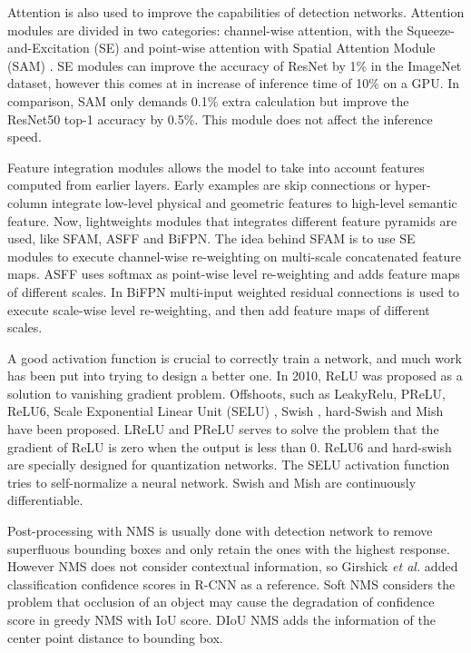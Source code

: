 Attention is also used to improve the capabilities of detection networks. Attention modules are divided in two categories: channel-wise attention, with the Squeeze-and-Excitation (SE)\cite{squeezeExcite} and point-wise attention with Spatial Attention Module (SAM) \cite{sam}. SE modules can improve the accuracy of ResNet by 1\% in the ImageNet\cite{imageNet} dataset, however this comes at in increase of inference time of 10\% on a GPU. In comparison, SAM only demands 0.1\% extra calculation but improve the ResNet50 top-1 accuracy by 0.5\%. This module does not affect the inference speed.

Feature integration modules allows the model to take into account features computed from earlier layers. Early examples are skip connections\cite{skipCo} or hyper-column\cite{hyperColumn} integrate low-level physical and geometric features to high-level semantic feature. Now, lightweights modules that integrates different feature pyramids are used, like SFAM\cite{SFAM}, ASFF\cite{ASFF} and BiFPN\cite{bifpn}. The idea behind SFAM is to use SE modules to execute channel-wise re-weighting on multi-scale concatenated feature maps. ASFF uses softmax as point-wise level re-weighting and adds feature maps of different scales. In BiFPN multi-input weighted residual connections is used to execute scale-wise level re-weighting, and then add feature maps of different scales.

A good activation function is crucial to correctly train a network, and much work has been put into trying to design a better one. In 2010, ReLU\cite{relu} was proposed as a solution to vanishing gradient problem. Offshoots, such as LeakyRelu\cite{leakyRelu}, PReLU\cite{prelu}, ReLU6\cite{mobileNet}, Scale Exponential Linear Unit (SELU) \cite{selu}, Swish \cite{swish}, hard-Swish\cite{hswish} and Mish\cite{mish} have been proposed. LReLU and PReLU serves to solve the problem that the gradient of ReLU is zero when the output is less than 0. ReLU6 and hard-swish are specially designed for quantization networks. The SELU activation function tries to self-normalize a neural network. Swish and Mish are continuously differentiable.

Post-processing with NMS is usually done with detection network to remove superfluous bounding boxes and only retain the ones with the highest response. However NMS does not consider contextual information, so Girshick \textit{et al.}\cite{girshick2013} added classification confidence scores in R-CNN as a reference. Soft NMS\cite{softNMS} considers the problem that occlusion of an object may cause the degradation of confidence score in greedy NMS with IoU score. DIoU NMS\cite{diou} adds the information of the center point distance to bounding box. 

